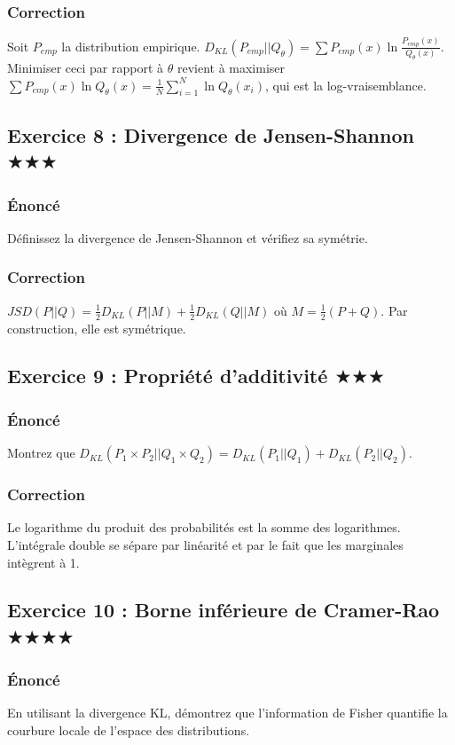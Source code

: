 \documentclass[11pt,a4paper]{article}
\begin{document}
\subsubsection*{Correction}
Soit $P_{emp}$ la distribution empirique. $D_{KL}(P_{emp} || Q_\theta) = \sum P_{emp}(x) \ln\frac{P_{emp}(x)}{Q_\theta(x)}$.
Minimiser ceci par rapport à $\theta$ revient à maximiser $\sum P_{emp}(x) \ln Q_\theta(x) = \frac{1}{N} \sum_{i=1}^N \ln Q_\theta(x_i)$, qui est la log-vraisemblance.

\subsection*{Exercice 8 : Divergence de Jensen-Shannon \quad $\bigstar\bigstar\bigstar$}
\subsubsection*{Énoncé}
Définissez la divergence de Jensen-Shannon et vérifiez sa symétrie.
\subsubsection*{Correction}
$JSD(P||Q) = \frac{1}{2} D_{KL}(P || M) + \frac{1}{2} D_{KL}(Q || M)$ où $M = \frac{1}{2}(P+Q)$. Par construction, elle est symétrique.

\subsection*{Exercice 9 : Propriété d'additivité \quad $\bigstar\bigstar\bigstar$}
\subsubsection*{Énoncé}
Montrez que $D_{KL}(P_1 \times P_2 || Q_1 \times Q_2) = D_{KL}(P_1 || Q_1) + D_{KL}(P_2 || Q_2)$.
\subsubsection*{Correction}
Le logarithme du produit des probabilités est la somme des logarithmes. L'intégrale double se sépare par linéarité et par le fait que les marginales intègrent à 1.

\subsection*{Exercice 10 : Borne inférieure de Cramer-Rao \quad $\bigstar\bigstar\bigstar\bigstar$}
\subsubsection*{Énoncé}
En utilisant la divergence KL, démontrez que l'information de Fisher quantifie la courbure locale de l'espace des distributions.
\end{document}
